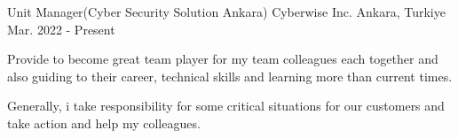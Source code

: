 
\begin{cventries}
  \cventry
    {Unit Manager(Cyber Security Solution Ankara)} %
    {Cyberwise Inc.} %
    {Ankara, Turkiye} %
    {Mar. 2022 - Present} %
    {
      \begin{cvitems} %
        \item {Provide to become great team player for my team colleagues each together and also guiding to their career, technical skills and learning more than current times.}
        \item {Generally, i take responsibility for some critical situations for our customers and take action and help my colleagues.}
      \end{cvitems}
    }


\end{cventries}
